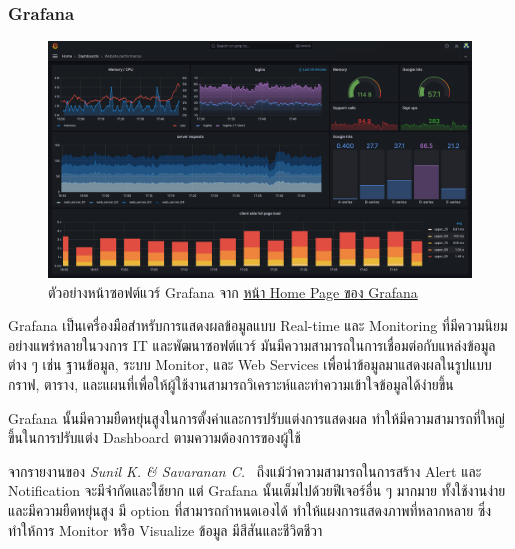 \documentclass[12pt,oneside,openright,a4paper]{cpe-thai-project}
\begin{document}
        \subsubsection{Grafana}
                \begin{figure}[H]
                \centering
                \includegraphics[width=14cm]{figure/literature/grafana.png}
                \caption[ตัวอย่างหน้าซอฟต์แวร์ Grafana]{ตัวอย่างหน้าซอฟต์แวร์ Grafana จาก \href{https://grafana.com/oss/grafana/}{หน้า Home Page ของ Grafana} }\label{fig:lit-grafana}
            \end{figure}
            \begin{flushleft}
                Grafana เป็นเครื่องมือสำหรับการแสดงผลข้อมูลแบบ Real-time และ Monitoring ที่มีความนิยมอย่างแพร่หลายในวงการ IT และพัฒนาซอฟต์แวร์ มันมีความสามารถในการเชื่อมต่อกับแหล่งข้อมูลต่าง ๆ เช่น ฐานข้อมูล, ระบบ Monitor, และ Web Services เพื่อนำข้อมูลมาแสดงผลในรูปแบบกราฟ, ตาราง, และแผนที่เพื่อให้ผู้ใช้งานสามารถวิเคราะห์และทำความเข้าใจข้อมูลได้ง่ายขึ้น~\cite{grafana}
            \end{flushleft}
            \begin{flushleft}
                Grafana นั้นมีความยืดหยุ่นสูงในการตั้งค่าและการปรับแต่งการแสดงผล ทำให้มีความสามารถที่ใหญ่ขึ้นในการปรับแต่ง Dashboard ตามความต้องการของผู้ใช้~\cite{grafana}
            \end{flushleft}
            \begin{flushleft}
                จากรายงานของ \textit{Sunil K. \& Savaranan C.}~\cite{sunil21grafana} ถึงแม้ว่าความสามารถในการสร้าง Alert และ Notification จะมีจำกัดและใช้ยาก แต่ Grafana นั้นเต็มไปด้วยฟีเจอร์อื่น ๆ มากมาย ทั้งใช้งานง่ายและมีความยืดหยุ่นสูง มี option ที่สามารถกำหนดเองได้ ทำให้แผงการแสดงภาพที่หลากหลาย ซึ่งทำให้การ Monitor หรือ Visualize ข้อมูล มีสีสันและชีวิตชีวา
            \end{flushleft}
\end{document}
